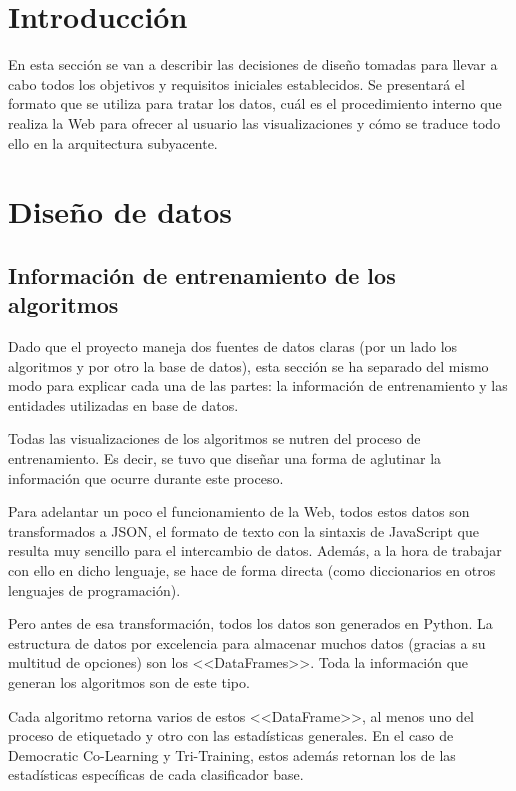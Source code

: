 
\section{Introducción}

En esta sección se van a describir las decisiones de diseño tomadas para llevar
a cabo todos los objetivos y requisitos iniciales establecidos. Se presentará el
formato que se utiliza para tratar los datos, cuál es el procedimiento interno
que realiza la Web para ofrecer al usuario las visualizaciones y cómo se traduce
todo ello en la arquitectura subyacente.

\section{Diseño de datos}

\subsection{Información de entrenamiento de los algoritmos}

Dado que el proyecto maneja dos fuentes de datos claras (por un lado los
algoritmos y por otro la base de datos), esta sección se ha separado del mismo
modo para explicar cada una de las partes: la información de entrenamiento y las
entidades utilizadas en base de datos.

\label{datos:entrenamiento}
Todas las visualizaciones de los algoritmos se nutren del proceso de
entrenamiento. Es decir, se tuvo que diseñar una forma de aglutinar la
información que ocurre durante este proceso.

Para adelantar un poco el funcionamiento de la Web, todos estos datos son
transformados a JSON, el formato de texto con la sintaxis de JavaScript que
resulta muy sencillo para el intercambio de datos. Además, a la hora de trabajar
con ello en dicho lenguaje, se hace de forma directa (como diccionarios en otros
lenguajes de programación).

Pero antes de esa transformación, todos los datos son generados en Python. La
estructura de datos por excelencia para almacenar muchos datos (gracias a su
multitud de opciones) son los <<DataFrames>>. Toda la información que generan
los algoritmos son de este tipo.

Cada algoritmo retorna varios de estos <<DataFrame>>, al menos uno del proceso
de etiquetado y otro con las estadísticas generales. En el caso de Democratic
Co-Learning y Tri-Training, estos además retornan los de las estadísticas
específicas de cada clasificador base.

